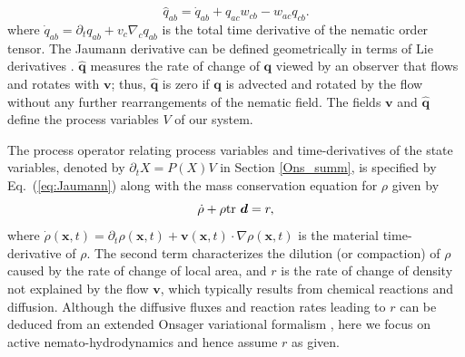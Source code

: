 \documentclass[12pt]{iopart}
\begin{document}
	\begin{equation} \label{jaumann_detivative_def}
		\widehat{q}_{ab} = \dot{q}_{ab}  + q_{ac} w_{cb} - w_{ac} q_{cb}.
	\end{equation}
	where $ \dot{q}_{ab} = \partial_t q_{ab} + v_c \nabla_c q_{ab}$ is the total time derivative of the nematic order tensor. The Jaumann derivative can be defined geometrically in terms of Lie derivatives \cite{marsden1994}. $\widehat{\bm{q}}$ measures the rate of change of $\bm{q}$ viewed by an observer that flows and rotates with $\bm{v}$; thus, $\widehat{\bm{q}}$ is zero if $\bm{q}$ is advected and rotated by the flow without any further rearrangements of the nematic field. The fields $\bm{v}$ and $\widehat{\bm{q}}$ define the process variables $V$ of our system.
	
	The process operator relating process variables and time-derivatives of the state variables, denoted by $\partial_t X = P(X)V$ in Section \ref{Ons_summ}, is specified by Eq.~(\ref{eq:Jaumann}) along with the mass conservation equation for $\rho$ given by 
	\begin{equation}
		\label{eq:balance_mass}
		\dot{\rho} + \rho {\rm tr}~\bm{d} = r ,
	\end{equation}
	where $\dot{\rho}(\bm{x},t) = \partial_t \rho(\bm{x},t) + \bm{v}(\bm{x},t)\cdot\nabla\rho(\bm{x},t)$ is the material time-derivative of $\rho$. The second term characterizes the dilution (or compaction) of $\rho$ caused by the rate of change of local area, and $r$ is the rate of change of density not explained by the flow $\bm{v}$, which typically results from chemical reactions and diffusion. Although the diffusive fluxes and reaction rates leading to $r$ can be deduced from an extended Onsager variational formalism \cite{Alexander,kaurin-bal}, here we focus on active nemato-hydrodynamics and hence assume $r$ as given.
	
\end{document}
